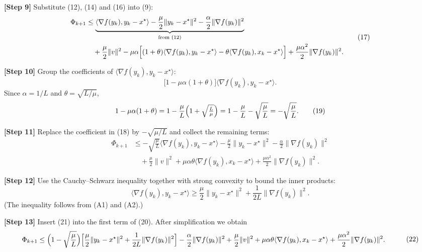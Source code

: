 \documentclass{article}
\newcommand{\grad}{\nabla}
\begin{document}
\noindent\textbf{[Step 9]}  Substitute (12), (14) and (16) into (9):
\[
\begin{aligned}
\Phi_{k+1}
&\le \underbrace{\langle\grad f(y_k),y_k-x^\star\rangle
    -\frac{\mu}{2}\|y_k-x^\star\|^2
    -\frac{\alpha}{2}\|\grad f(y_k)\|^2}_{\text{from (12)}}
\\
&\quad +\frac{\mu}{2}\|v\|^2
   -\mu\alpha\Bigl[(1+\theta)\langle\grad f(y_k),y_k-x^\star\rangle
                 -\theta\langle\grad f(y_k),x_k-x^\star\rangle\Bigr]
   +\frac{\mu\alpha^{2}}{2}\|\grad f(y_k)\|^2 .
\end{aligned}
\tag{17}
\]

\noindent\textbf{[Step 10]}  Group the coefficients of $\langle\grad f(y_k),y_k-x^\star\rangle$:
\[
\bigl[1-\mu\alpha(1+\theta)\bigr]\langle\grad f(y_k),y_k-x^\star\rangle .
\tag{18}
\]
Since $\alpha=1/L$ and $\theta=\sqrt{L/\mu}$,
\[
1-\mu\alpha(1+\theta)=1-\frac{\mu}{L}\Bigl(1+\sqrt{\tfrac{L}{\mu}}\Bigr)
=1-\frac{\mu}{L}-\sqrt{\frac{\mu}{L}}
= -\sqrt{\frac{\mu}{L}} .
\tag{19}
\]

\noindent\textbf{[Step 11]}  Replace the coefficient in (18) by $-\sqrt{\mu/L}$ and collect the remaining terms:
\[
\begin{aligned}
\Phi_{k+1}
&\le -\sqrt{\frac{\mu}{L}}\langle\grad f(y_k),y_k-x^\star\rangle
   -\frac{\mu}{2}\|y_k-x^\star\|^2
   -\frac{\alpha}{2}\|\grad f(y_k)\|^2   \\
&\quad +\frac{\mu}{2}\|v\|^2
   +\mu\alpha\theta\langle\grad f(y_k),x_k-x^\star\rangle
   +\frac{\mu\alpha^{2}}{2}\|\grad f(y_k)\|^2 .
\end{aligned}
\tag{20}
\]

\noindent\textbf{[Step 12]}  Use the Cauchy–Schwarz inequality together with strong convexity to bound the inner products:
\[
\langle\grad f(y_k),y_k-x^\star\rangle
\ge \frac{\mu}{2}\|y_k-x^\star\|^2
    +\frac{1}{2L}\|\grad f(y_k)\|^2 .
\tag{21}
\]
(The inequality follows from (A1) and (A2).)

\noindent\textbf{[Step 13]}  Insert (21) into the first term of (20). After simplification we obtain
\[
\begin{aligned}
\Phi_{k+1}
&\le \Bigl(1-\sqrt{\frac{\mu}{L}}\Bigr)
      \Bigl[\frac{\mu}{2}\|y_k-x^\star\|^2
            +\frac{1}{2L}\|\grad f(y_k)\|^2\Bigr]
   -\frac{\alpha}{2}\|\grad f(y_k)\|^2
   +\frac{\mu}{2}\|v\|^2
   +\mu\alpha\theta\langle\grad f(y_k),x_k-x^\star\rangle
   +\frac{\mu\alpha^{2}}{2}\|\grad f(y_k)\|^2 .
\end{aligned}
\tag{22}
\]
\end{document}

